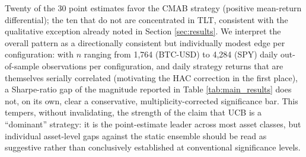 \documentclass[pdflatex,sn-mathphys-num]{sn-jnl}
\theoremstyle{thmstyleone}%
\theoremstyle{thmstyletwo}%
\theoremstyle{thmstylethree}%
\begin{document}
Twenty of the 30 point estimates favor the CMAB strategy (positive mean-return differential); the ten that do not are concentrated in TLT, consistent with the qualitative exception already noted in Section \ref{sec:results}. We interpret the overall pattern as a directionally consistent but individually modest edge per configuration: with $n$ ranging from 1,764 (BTC-USD) to 4,284 (SPY) daily out-of-sample observations per configuration, and daily strategy returns that are themselves serially correlated (motivating the HAC correction in the first place), a Sharpe-ratio gap of the magnitude reported in Table \ref{tab:main_results} does not, on its own, clear a conservative, multiplicity-corrected significance bar. This tempers, without invalidating, the strength of the claim that UCB is a ``dominant'' strategy: it is the point-estimate leader across most asset classes, but individual asset-level gaps against the static ensemble should be read as suggestive rather than conclusively established at conventional significance levels.
\end{document}
